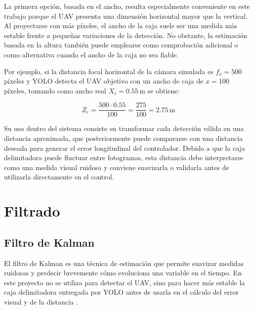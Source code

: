 La primera opción, basada en el ancho, resulta especialmente conveniente en este trabajo porque el UAV presenta una dimensión horizontal mayor que la vertical. Al proyectarse con más píxeles, el ancho de la caja suele ser una medida más estable frente a pequeñas variaciones de la detección. No obstante, la estimación basada en la altura también puede emplearse como comprobación adicional o como alternativa cuando el ancho de la caja no sea fiable.

\vspace{0.3cm}

Por ejemplo, si la distancia focal horizontal de la cámara simulada es $f_x = 500$ píxeles y YOLO detecta el UAV objetivo con un ancho de caja de $x = 100$ píxeles, tomando como ancho real $X_c = 0.55\,\mathrm{m}$ se obtiene:

\begin{equation}
Z_c = \frac{500 \cdot 0.55}{100} = \frac{275}{100} = 2.75\,\mathrm{m}
\end{equation}

\vspace{0.3cm}

Su uso dentro del sistema consiste en transformar cada detección válida en una distancia aproximada, que posteriormente puede compararse con una distancia deseada para generar el error longitudinal del controlador. Debido a que la caja delimitadora puede fluctuar entre fotogramas, esta distancia debe interpretarse como una medida visual ruidosa y conviene suavizarla o validarla antes de utilizarla directamente en el control.

\vspace{0.3cm}




\section{Filtrado }

\subsection{Filtro de Kalman}

El filtro de Kalman es una técnica de estimación que permite suavizar medidas ruidosas y predecir brevemente cómo evoluciona una variable en el tiempo. En este proyecto no se utiliza para detectar el UAV, sino para hacer más estable la caja delimitadora entregada por YOLO antes de usarla en el cálculo del error visual y de la distancia \cite{kalman1960new, kalmanfilterNetES, wikipediaFiltroKalman}.

